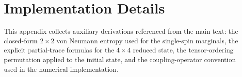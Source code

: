 \documentclass[12pt,a4paper]{article}
\newcommand{\rhohat}{\hat{\rho}}
\renewcommand{\Tr}{\mathrm{Tr}}
\begin{document}

\section{Implementation Details}
\label{app:implementation}

This appendix collects auxiliary derivations referenced from the main text: the closed-form $2\times2$ von Neumann entropy used for the single-spin marginals, the explicit partial-trace formulas for the $4\times4$ reduced state, the tensor-ordering permutation applied to the initial state, and the coupling-operator convention used in the numerical implementation.
\end{document}
